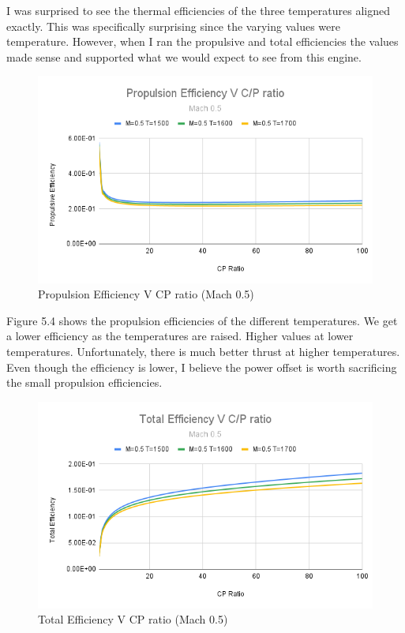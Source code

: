\documentclass[12pt]{report}
\begin{document}
I was surprised to see the thermal efficiencies of the three temperatures aligned exactly. This was specifically surprising since the varying values were temperature. However, when I ran the propulsive and total efficiencies the values made sense and supported what we would expect to see from this engine.

\begin{figure}[H]
    \centering
    \includegraphics[width=15.5 cm]{Propulsion Efficiency V C_P ratio (Mach 0.5).png}
    \caption{Propulsion Efficiency V CP ratio (Mach 0.5)}
    \label{fig: Propulsion Efficiency V CP ratio (Mach 0.5)}
\end{figure}

Figure 5.4 shows the propulsion efficiencies of the different temperatures.  We get a lower efficiency as the temperatures are raised.  Higher values at lower temperatures. Unfortunately, there is much better thrust at higher temperatures.  Even though the efficiency is lower, I believe the power offset is worth sacrificing the small propulsion efficiencies.

\begin{figure}[H]
    \centering
    \includegraphics[width=15.5 cm]{Total Efficiency V C_P ratio (Mach 0.5).png}
    \caption{Total Efficiency V CP ratio (Mach 0.5)}
    \label{fig: Total Efficiency V CP ratio (Mach 0.5)}
\end{figure}
\end{document}
